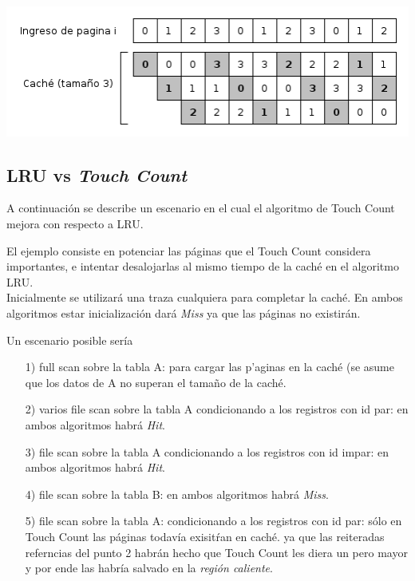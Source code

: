 \documentclass[11pt, a4paper, spanish]{article}
\begin{document}
	\begin{center}
	\includegraphics[scale=0.65]{diagramas/LRUPathological.png}\\
	\end{center}

\subsection{ LRU vs \textit{Touch Count}}

A continuaci\'on se describe un escenario en el cual el algoritmo de Touch Count mejora con respecto a LRU.

El ejemplo consiste en potenciar las p\'aginas que el Touch Count considera importantes, e intentar desalojarlas al mismo tiempo de la cach\'e en el
algoritmo LRU.\\

Inicialmente se utilizar\'a una traza cualquiera para completar la cach\'e. En ambos algoritmos estar inicializaci\'on dar\'a \textit{Miss} ya que
las p\'aginas no existir\'an.

Un escenario posible ser\'ia

\begin{itemize}
	\item[1)] full scan sobre la tabla A: para cargar las p'aginas en la cach\'e (se asume que los datos de A no superan el tama\~{n}o de la cach\'e.
	\item[2)] varios file scan sobre la tabla A condicionando a los registros con id par: en ambos algoritmos habr\'a \textit{Hit}.
	\item[3)] file scan sobre la tabla A condicionando a los registros con id impar: en ambos algoritmos habr\'a \textit{Hit}.
	\item[4)] file scan sobre la tabla B: en ambos algoritmos habr\'a \textit{Miss}.
	\item[5)] file scan sobre la tabla A: condicionando a los registros con id par: s\'olo en Touch Count las p\'aginas todav\'ia exisit\'ran en cach\'e.
ya que las reiteradas referncias del punto 2 habr\'an hecho que Touch Count les diera un pero mayor y por ende las habr\'ia salvado en la \textit{regi\'on caliente}.
\end{itemize}
\end{document}
